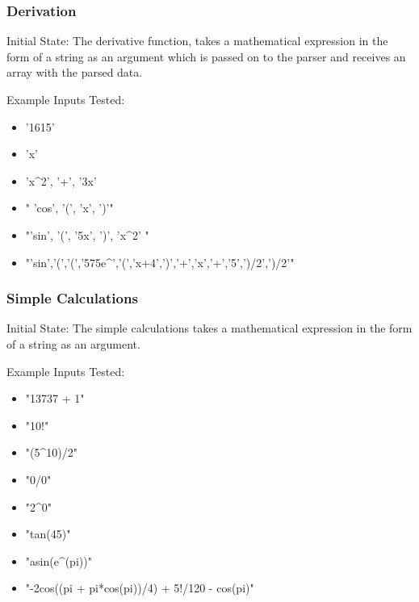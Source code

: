 \documentclass[12pt, titlepage]{article}
\begin{document}
\subsubsection{Derivation}
Initial State: The derivative function, takes a mathematical expression in the form of a string as an argument which is passed on to the parser and receives an array with the parsed data.
\newline

Example Inputs Tested:
\begin{itemize}
\item '1615'
\item 'x'
\item 'x\^{}2', '+', '3x'
\item " 'cos', '(', 'x', ')'"
\item "'sin', '(', '5x', ')', 'x\^{}2' "
\item "'sin','(','(','575e\^{}','(','x+4',')','+','x','+','5',')/2',')/2'"

\end{itemize}
\subsubsection{Simple Calculations}
Initial State: The simple calculations takes a mathematical expression in the form of a string as an argument.
\newline

Example Inputs Tested:
\begin{itemize}
\item "13737 + 1"
\item "10!"
\item "(5\^{}10)/2"
\item "0/0"
\item "2\^{}0"
\item "tan(45)"
\item "asin(e\^{}(pi))"
\item "-2cos((pi + pi*cos(pi))/4) + 5!/120 - cos(pi)"
\end{itemize}
\end{document}
